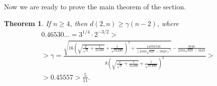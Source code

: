 \documentclass[a4paper,14pt]{article} %
\theoremstyle{plain}
\newtheorem{theorem}{Theorem}[section]
\theoremstyle{definition}
\begin{document}
Now we are ready to prove the main theorem of the section.

\begin{theorem}
	\label{thm:main_estimate}
	If $n\geq 4$, then $d(2,n) \geq \gamma (n - 2)$,
	where
	\begin{multline}
		0.46530... =
		3^{1/4} \cdot 2^{-3/2} >
		\\ >
		\gamma = \frac{\sqrt{16 {{\left( \sqrt{\frac{2}{\sqrt{3}}+\frac{1}{21490}}+\frac{1}{\sqrt{21490}}\right) }^{2}}+\frac{14791716}{{{\left( 2593 \sqrt{647}-5823\right) }^{2}}}}-\frac{3846}{2593 \sqrt{647}-5823}}{8 {{\left( \sqrt{\frac{2}{\sqrt{3}}+\frac{1}{21490}}+\frac{1}{\sqrt{21490}}\right) }^{2}}}
		>\\
		> 0.45557
		> \frac{5}{11}
		.
	\end{multline}
\end{theorem}
\end{document}
